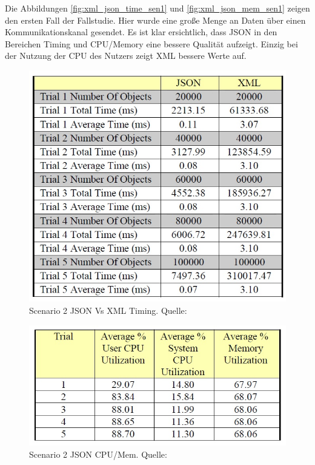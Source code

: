 \documentclass[a4paper]{article}
\begin{document}
	\newpage
	
	Die Abbildungen \ref{fig:xml_json_time_sen1} und \ref{fig:xml_json_mem_sen1}
	zeigen den ersten Fall der Fallstudie. Hier wurde eine große Menge an Daten
	über einen Kommunikationskanal gesendet. Es ist klar ersichtlich, dass JSON
	in den Bereichen Timing und CPU/Memory eine bessere Qualität aufzeigt. Einzig
	bei der Nutzung der CPU des Nutzers zeigt XML bessere Werte auf.
	
	\begin{figure}[H] 
		\centerline{
			\includegraphics[scale=0.8]{../Bilder/xml_json_time_sen2.jpg}
		}
		\caption{Scenario 2 JSON Vs XML Timing. Quelle: \cite{XmlJson}}
		\label{fig:xml_json_time_sen2}
	\end{figure}
	
	\begin{figure}[H] 
		\includegraphics[width=\linewidth]{../Bilder/json_mem_sen2.jpg}
		\caption{Scenario 2 JSON CPU/Mem. Quelle: \cite{XmlJson}}
		\label{fig:json_mem_sen2}
	\end{figure}
	
\end{document}
